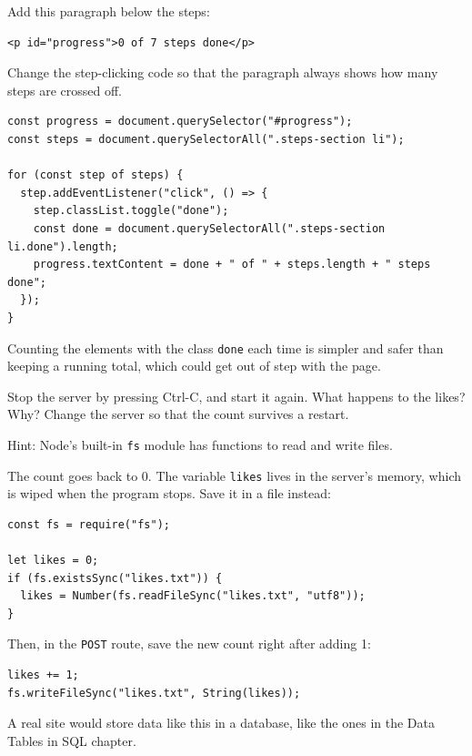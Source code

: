 \begin{Exercise}[title={Progress Counter}, label=cj_progress]
Add this paragraph below the steps:
\begin{verbatim}
<p id="progress">0 of 7 steps done</p>
\end{verbatim}
Change the step-clicking
code so that the paragraph always shows how many steps are crossed off.
\end{Exercise}
\begin{Answer}[ref=cj_progress]
\begin{verbatim}
const progress = document.querySelector("#progress");
const steps = document.querySelectorAll(".steps-section li");

for (const step of steps) {
  step.addEventListener("click", () => {
    step.classList.toggle("done");
    const done = document.querySelectorAll(".steps-section li.done").length;
    progress.textContent = done + " of " + steps.length + " steps done";
  });
}
\end{verbatim}
Counting the elements with the class \verb|done| each time is simpler and safer than keeping a running
total, which could get out of step with the page.
\end{Answer}

\begin{Exercise}[title={Where Did the Likes Go?}, label=cj_persist]
Stop the server by pressing Ctrl-C, and start it again. What happens to the likes? Why? Change the
server so that the count survives a restart.

Hint: Node's built-in \verb|fs| module has functions to read and write files.
\end{Exercise}
\begin{Answer}[ref=cj_persist]
The count goes back to 0. The variable \verb|likes| lives in the server's memory, which is wiped when the
program stops. Save it in a file instead:
\begin{verbatim}
const fs = require("fs");

let likes = 0;
if (fs.existsSync("likes.txt")) {
  likes = Number(fs.readFileSync("likes.txt", "utf8"));
}
\end{verbatim}
Then, in the \verb|POST| route, save the new count right after adding 1:
\begin{verbatim}
likes += 1;
fs.writeFileSync("likes.txt", String(likes));
\end{verbatim}
A real site would store data like this in a
database, like the ones in the Data Tables in SQL chapter.
\end{Answer}

